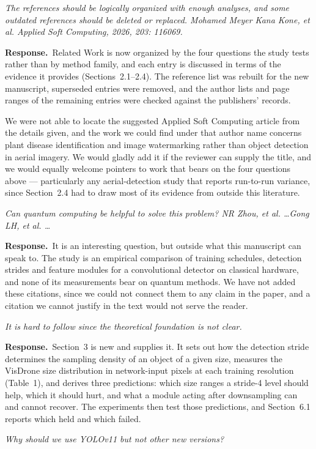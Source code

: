 \documentclass[11pt, a4paper]{article}
\newcommand{\point}[1]{\medskip\noindent\textit{#1}\par}
\newcommand{\reply}{\textbf{Response.}\ }
\begin{document}
\point{The references should be logically organized with enough analyses, and
some outdated references should be deleted or replaced. Mohamed Meyer Kana Kone,
et al. Applied Soft Computing, 2026, 203: 116069.}

\reply Related Work is now organized by the four questions the study tests rather
than by method family, and each entry is discussed in terms of the evidence it
provides (Sections~2.1--2.4). The reference list was rebuilt for the new
manuscript, superseded entries were removed, and the author lists and page ranges
of the remaining entries were checked against the publishers' records.

We were not able to locate the suggested Applied Soft Computing article from the
details given, and the work we could find under that author name concerns plant
disease identification and image watermarking rather than object detection in
aerial imagery. We would gladly add it if the reviewer can supply the title, and
we would equally welcome pointers to work that bears on the four questions above
--- particularly any aerial-detection study that reports run-to-run variance,
since Section~2.4 had to draw most of its evidence from outside this literature.

\point{Can quantum computing be helpful to solve this problem? NR Zhou, et al.
\dots Gong LH, et al. \dots}

\reply It is an interesting question, but outside what this manuscript can speak
to. The study is an empirical comparison of training schedules, detection strides
and feature modules for a convolutional detector on classical hardware, and none
of its measurements bear on quantum methods. We have not added these citations,
since we could not connect them to any claim in the paper, and a citation we
cannot justify in the text would not serve the reader.

\point{It is hard to follow since the theoretical foundation is not clear.}

\reply Section~3 is new and supplies it. It sets out how the detection stride
determines the sampling density of an object of a given size, measures the
VisDrone size distribution in network-input pixels at each training resolution
(Table~1), and derives three predictions: which size ranges a stride-4 level
should help, which it should hurt, and what a module acting after downsampling can
and cannot recover. The experiments then test those predictions, and Section~6.1
reports which held and which failed.

\point{Why should we use YOLOv11 but not other new versions?}
\end{document}
